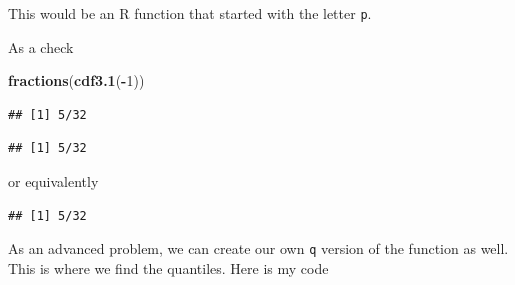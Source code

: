 \documentclass[]{book}
\newenvironment{Shaded}{\begin{snugshade}}{\end{snugshade}}
\newcommand{\KeywordTok}[1]{\textcolor[rgb]{0.13,0.29,0.53}{\textbf{#1}}}
\newcommand{\DecValTok}[1]{\textcolor[rgb]{0.00,0.00,0.81}{#1}}
\newcommand{\OtherTok}[1]{\textcolor[rgb]{0.56,0.35,0.01}{#1}}
\newcommand{\ControlFlowTok}[1]{\textcolor[rgb]{0.13,0.29,0.53}{\textbf{#1}}}
\newcommand{\OperatorTok}[1]{\textcolor[rgb]{0.81,0.36,0.00}{\textbf{#1}}}
\newcommand{\NormalTok}[1]{#1}
\theoremstyle{definition}
\theoremstyle{definition}
\theoremstyle{definition}
\theoremstyle{remark}
\begin{document}
This would be an R function that started with the letter \texttt{p}.

As a check

\begin{Shaded}
\begin{Highlighting}[]
\KeywordTok{fractions}\NormalTok{(}\KeywordTok{cdf3.1}\NormalTok{(}\OperatorTok{-}\DecValTok{1}\NormalTok{))}
\end{Highlighting}
\end{Shaded}

\begin{verbatim}
## [1] 5/32
\end{verbatim}

\begin{Shaded}
\end{Shaded}

\begin{verbatim}
## [1] 5/32
\end{verbatim}

or equivalently

\begin{Shaded}
\end{Shaded}

\begin{verbatim}
## [1] 5/32
\end{verbatim}

As an advanced problem, we can create our own \texttt{q} version of the
function as well. This is where we find the quantiles. Here is my code

\begin{Shaded}
\end{Shaded}
\end{document}
